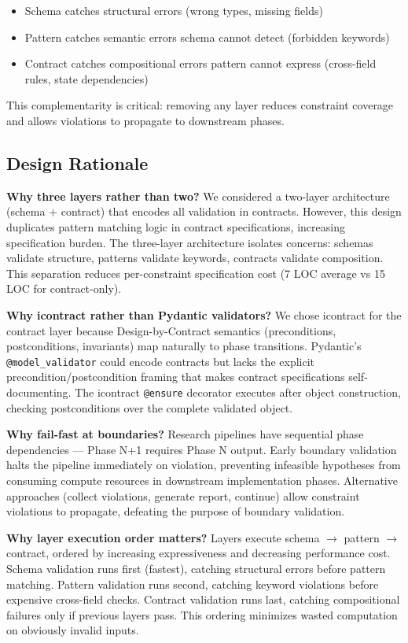 \begin{itemize}
\item Schema catches structural errors (wrong types, missing fields)
\item Pattern catches semantic errors schema cannot detect (forbidden keywords)
\item Contract catches compositional errors pattern cannot express (cross-field rules, state dependencies)
\end{itemize}

This complementarity is critical: removing any layer reduces constraint coverage and allows violations to propagate to downstream phases.

\subsection{Design Rationale}

\textbf{Why three layers rather than two?} We considered a two-layer architecture (schema + contract) that encodes all validation in contracts. However, this design duplicates pattern matching logic in contract specifications, increasing specification burden. The three-layer architecture isolates concerns: schemas validate structure, patterns validate keywords, contracts validate composition. This separation reduces per-constraint specification cost (7 LOC average vs 15 LOC for contract-only).

\textbf{Why icontract rather than Pydantic validators?} We chose icontract for the contract layer because Design-by-Contract semantics (preconditions, postconditions, invariants) map naturally to phase transitions. Pydantic's \texttt{@model\_validator} could encode contracts but lacks the explicit precondition/postcondition framing that makes contract specifications self-documenting. The icontract \texttt{@ensure} decorator executes after object construction, checking postconditions over the complete validated object.

\textbf{Why fail-fast at boundaries?} Research pipelines have sequential phase dependencies --- Phase N+1 requires Phase N output. Early boundary validation halts the pipeline immediately on violation, preventing infeasible hypotheses from consuming compute resources in downstream implementation phases. Alternative approaches (collect violations, generate report, continue) allow constraint violations to propagate, defeating the purpose of boundary validation.

\textbf{Why layer execution order matters?} Layers execute schema $\rightarrow$ pattern $\rightarrow$ contract, ordered by increasing expressiveness and decreasing performance cost. Schema validation runs first (fastest), catching structural errors before pattern matching. Pattern validation runs second, catching keyword violations before expensive cross-field checks. Contract validation runs last, catching compositional failures only if previous layers pass. This ordering minimizes wasted computation on obviously invalid inputs.

